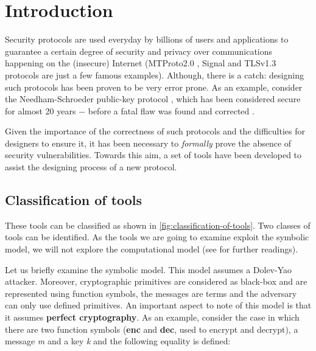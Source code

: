 
\section{Introduction}
\label{section:introduction}

Security protocols are used everyday by billions of users and applications to guarantee a certain degree of security and privacy over communications happening on the (insecure) Internet (MTProto2.0 \cite{Telegram-MTProto2.0}, Signal \cite{Signal} and TLSv1.3 \cite{TLSv1.3_specs} protocols are just a few famous examples). Although, there is a catch: designing such protocols has been proven to be very error prone. As an example, consider the Needham-Schroeder public-key protocol \cite{NSPK}, which has been considered secure for almost 20 years $-$ before a fatal flaw was found and corrected \cite{NSPK_LoweGavin}.

Given the importance of the correctness of such protocols and the difficulties for designers to ensure it, it has been necessary to \textit{formally} prove the absence of security vulnerabilities. Towards this aim, a set of tools have been developed to assist the designing process of a new protocol.

\subsection{Classification of tools}


These tools can be classified as shown in \cref{fig:classification-of-tools}. Two classes of tools can be identified. As the tools we are going to examine exploit the symbolic model, we will not explore the computational model (see \cite{ReconcilingComputationalSymbolic, SymbolicComputationalBlanchet, 10.1007/978-3-540-31987-0_12} for further readings). 

Let us briefly examine the symbolic model. This model assumes a Dolev-Yao \cite{Dolev-Yao} attacker. Moreover, cryptographic primitives are considered as black-box and are represented using function symbols, the messages are terms and the adversary can only use defined primitives. An important aspect to note of this model is that it assumes \textbf{perfect cryptography}. As an example, consider the case in which there are two function symbols (\textbf{enc} and \textbf{dec}, used to encrypt and decrypt), a message \textit{m} and a key \textit{k} and the following equality is defined:


